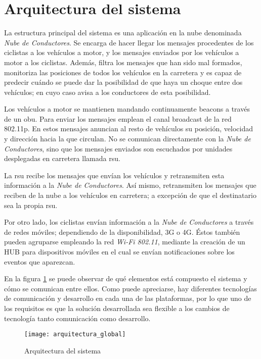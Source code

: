 \section{Arquitectura del sistema}\label{section:arquitecturaSistema}
La estructura principal del sistema es una aplicación en la nube denominada
\emph{Nube de Conductores}. Se encarga de hacer llegar los mensajes procedentes
de los ciclistas a los vehículos a motor, y los mensajes enviados por los vehículos
a motor a los ciclistas. Además, filtra los mensajes que han sido mal formados,
monitoriza las posiciones de todos los vehículos en la carretera y es capaz de
predecir cuándo se puede dar la posibilidad de que haya un choque entre dos vehículos;
en cuyo caso avisa a los conductores de esta posibilidad.

Los vehículos a motor se mantienen mandando continuamente beacons a través de un
\gls{obu}. Para enviar los mensajes emplean el canal broadcast de la red 802.11p.
En estos mensajes anuncian al resto de vehículos su posición, velocidad y dirección
hacia la que circulan. No se comunican directamente con la \emph{Nube de Conductores},
sino que los mensajes enviados son escuchados por unidades desplegadas en carretera
llamada \gls{rsu}.

La \gls{rsu} recibe los mensajes que envían los vehículos y retransmiten esta
información a la \emph{Nube de Conductores}. Así mismo, retransmiten los mensajes
que reciben de la nube a los vehículos en carretera; a excepción de que el
destinatario sea la propia \gls{rsu}.

Por otro lado, los ciclistas envían información a la \emph{Nube de Conductores} a
través de redes móviles; dependiendo de la disponibilidad, 3G o 4G. Éstos también
pueden agruparse empleando la red \emph{Wi-Fi 802.11}, mediante la creación de un
HUB para dispositivos móviles en el cual se envían notificaciones sobre los eventos
que aparezcan.

En la figura \ref{fig:ArquitecturaSistema} se puede observar de qué elementos está
compuesto el sistema y cómo se comunican entre ellos. Como puede apreciarse, hay
diferentes tecnologías de comunicación y desarrollo en cada una de las plataformas,
por lo que uno de los requisitos es que la solución desarrollada sea flexible a los
cambios de tecnología tanto comunicación como desarrollo.

\begin{figure}[H]
	\begin{center}
		\texttt{[image: arquitectura\_global]}
		\caption{Arquitectura del sistema}
		\label{fig:ArquitecturaSistema}
	 \end{center}
\end{figure}



